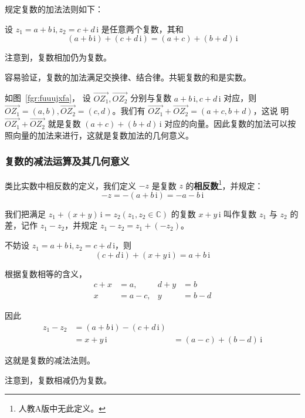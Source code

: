 \documentclass[a4paper,openany]{ctexbook}
\renewcommand{\vec}{\overrightarrow}
\newcommand{\ii}{\,\mathrm{i}}
\begin{document}
规定复数的加法法则如下：

设 \(z_1=a+b \ii,z_2=c+d \ii\) 是任意两个复数，其和
\[
    (a+b \ii)+(c+d \ii)=(a+c)+(b+d) \ii
\]

注意到，复数相加仍为复数。

容易验证，复数的加法满足交换律、结合律。共轭复数的和是实数。

如图~\ref{fgr:fuuujxfa}，%
设 \(\vec{OZ_1},\vec{OZ_2}\) 分别与复数 \(a+b\ii,c+d\ii\) 对应，则 \(\vec{OZ_1}=(a,b),\vec{OZ_2}=(c,d)\)。我们有 \(\vec{OZ_1}+\vec{OZ_2}=(a+c,b+d)\)，这说
明 \(\vec{OZ_1}+\vec{OZ_2}\) 就是复数 \((a+c)+(b+d) \ii\) 对应的向量。因此复数的加法可以按照向量的加法来进行，这就是复数加法的几何意义。

\subsubsection{复数的减法运算及其几何意义}

类比实数中相反数的定义，我们定义 \(-z\) 是复数 \(z\) 的\textbf{相反数}\footnote{人教A版中无此定义。}，并规定：
\[
    -z=-(a+b\ii)=-a-b\ii
\]

我们把满足 \(z_1+(x+y)\ii=z_2(z_1,z_2 \in \mathbb{C})\) 的复数 \(x+y\ii\) 叫作复数 \(z_1\) 与 \(z_2\) 的差，记作 \(z_1-z_2\)，并规定 \(z_1-z_2=z_1+(-z_2)\)。

不妨设 \(z_1=a+b\ii,z_2=c+d\ii\)，则\[(c+d\ii)+(x+y\ii)=a+b\ii\]

根据复数相等的含义，
\begin{align*}
    c+x & = a,  & d+y & =b   \\
    x   & =a-c, & y   & =b-d
\end{align*}

因此
\begin{align*}
    z_1-z_2 & =(a+b\ii)-(c+d\ii) \\
            & =x+y\ii
            & =(a-c)+(b-d)\ii
\end{align*}

这就是复数的减法法则。

注意到，复数相减仍为复数。
\end{document}
